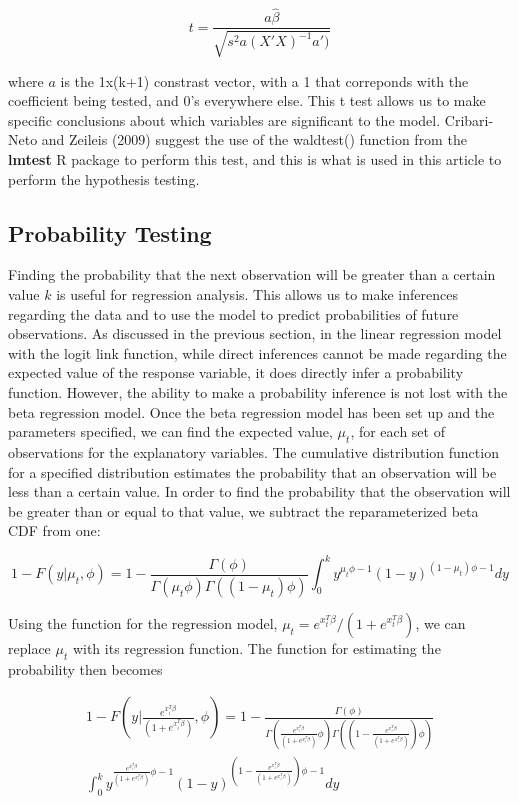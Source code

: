 \documentclass{svproc}
\begin{document}
\begin{equation}
t=\frac{a \hat{\beta}}{\sqrt{s^2a(X'X)^{-1}a')}}
\end{equation}

where $a$ is the 1x(k+1) constrast vector, with a 1 that correponds with the coefficient being tested, and 0's everywhere else. This t test allows us to make specific conclusions about which variables are significant to the model. Cribari-Neto and Zeileis (2009) suggest the use of the waldtest() function from the \textbf{lmtest} R package to perform this test, and this is what is used in this article to perform the hypothesis testing.

\subsection{Probability Testing}

Finding the probability that the next observation will be greater than a certain value $k$ is useful for regression analysis. This allows us to make inferences regarding the data and to use the model to predict probabilities of future observations. As discussed in the previous section, in the linear regression model with the logit link function, while direct inferences cannot be made regarding the expected value of the response variable, it does directly infer a probability function. However, the ability to make a probability inference is not lost with the beta regression model. Once the beta regression model has been set up and the parameters specified, we can find the expected value, $\mu_t$, for each set of observations for the explanatory variables. The cumulative distribution function for a specified distribution estimates the probability that an observation will be less than a certain value. In order to find the probability that the observation will be greater than or equal to that value, we subtract the reparameterized beta CDF from one:

\begin{equation}
1 - F(y|\mu_t, \phi) = 1 - \frac{\Gamma (\phi)}{\Gamma (\mu_t \phi) \Gamma ((1-\mu_t)\phi)} \int_0^k y^{\mu_t\phi - 1}(1-y)^{(1-\mu_t)\phi-1}dy
\end{equation}

Using the function for the regression model, $\mu_t = e^{x_t^T \beta}/(1+e^{x_t^T \beta})$, we can replace $\mu_t$ with its regression function. The function for estimating the probability then becomes

\begin{equation}
\begin{split}
1 - F(y|\frac{e^{x_i^T \beta}}{(1+e^{x_i^T \beta})}, \phi) = 1 - \frac{\Gamma (\phi)}{\Gamma (\frac{e^{x_i^T \beta}}{(1+e^{x_i^T \beta})} \phi) \Gamma ((1-\frac{e^{x_i^T \beta}}{(1+e^{x_i^T \beta})})\phi)} \\ \int_0^k y^{\frac{e^{x_i^T \beta}}{(1+e^{x_i^T \beta})}\phi - 1}(1-y)^{(1-\frac{e^{x_i^T \beta}}{(1+e^{x_i^T \beta})})\phi-1}dy
\end{split}
\end{equation}
\end{document}
